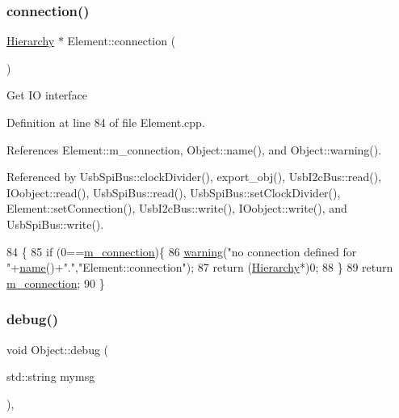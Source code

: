 \subsubsection{\texorpdfstring{connection()}{connection()}}
{\footnotesize\ttfamily \hyperlink{classHierarchy}{Hierarchy} $\ast$ Element\+::connection (\begin{DoxyParamCaption}{ }\end{DoxyParamCaption})\hspace{0.3cm}{\ttfamily [inherited]}}

Get IO interface 

Definition at line 84 of file Element.\+cpp.



References Element\+::m\+\_\+connection, Object\+::name(), and Object\+::warning().



Referenced by Usb\+Spi\+Bus\+::clock\+Divider(), export\+\_\+obj(), Usb\+I2c\+Bus\+::read(), I\+Oobject\+::read(), Usb\+Spi\+Bus\+::read(), Usb\+Spi\+Bus\+::set\+Clock\+Divider(), Element\+::set\+Connection(), Usb\+I2c\+Bus\+::write(), I\+Oobject\+::write(), and Usb\+Spi\+Bus\+::write().


\begin{DoxyCode}
84                               \{
85   \textcolor{keywordflow}{if} (0==\hyperlink{classElement_abe3de7a5dbbc9a6dd2d7e012e5fdb266}{m\_connection})\{
86     \hyperlink{classObject_a65cd4fda577711660821fd2cd5a3b4c9}{warning}(\textcolor{stringliteral}{"no connection defined for "}+\hyperlink{classObject_a300f4c05dd468c7bb8b3c968868443c1}{name}()+\textcolor{stringliteral}{"."},\textcolor{stringliteral}{"Element::connection"});
87     \textcolor{keywordflow}{return} (\hyperlink{classHierarchy}{Hierarchy}*)0;
88   \}
89   \textcolor{keywordflow}{return} \hyperlink{classElement_abe3de7a5dbbc9a6dd2d7e012e5fdb266}{m\_connection};
90 \}
\end{DoxyCode}
\mbox{\label{classObject_aac010553f022165573714b7014a15f0d}} 
\subsubsection{\texorpdfstring{debug()}{debug()}\hspace{0.1cm}{\footnotesize\ttfamily [1/2]}}
{\footnotesize\ttfamily void Object\+::debug (\begin{DoxyParamCaption}\item[{std\+::string}]{mymsg }\end{DoxyParamCaption})\hspace{0.3cm}{\ttfamily [inline]}, {\ttfamily [inherited]}}



